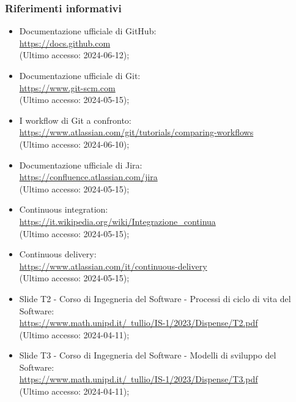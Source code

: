 \subsubsection{Riferimenti informativi}
\begin{itemize}
  \item Documentazione ufficiale di GitHub: \\ \href{https://docs.github.com}{https://docs.github.com}  \\ (Ultimo accesso: 2024-06-12);
  \item Documentazione ufficiale di Git: \\ \href{https://www.git-scm.com}{https://www.git-scm.com}  \\ (Ultimo accesso: 2024-05-15);
  \item I workflow di Git a confronto: \\ \href{https://www.atlassian.com/git/tutorials/comparing-workflows}{https://www.atlassian.com/git/tutorials/comparing-workflows}  \\ (Ultimo accesso: 2024-06-10);
  \item Documentazione ufficiale di Jira: \\ \href{https://confluence.atlassian.com/jira}{https://confluence.atlassian.com/jira}  \\ (Ultimo accesso: 2024-05-15);
  \item Continuous integration: \\ \href{https://it.wikipedia.org/wiki/Integrazionecontinua}{https://it.wikipedia.org/wiki/Integrazione\_continua}  \\ (Ultimo accesso: 2024-05-15);
  \item Continuous delivery: \\ \href{https://www.atlassian.com/it/continuous-delivery}{https://www.atlassian.com/it/continuous-delivery}  \\ (Ultimo accesso: 2024-05-15);
  \item Slide T2 - Corso di Ingegneria del Software - Processi di ciclo di vita del Software: \\ \href{https://www.math.unipd.it/~tullio/IS-1/2023/Dispense/T2.pdf}{https://www.math.unipd.it/~tullio/IS-1/2023/Dispense/T2.pdf}  \\ (Ultimo accesso: 2024-04-11);
  \item Slide T3 - Corso di Ingegneria del Software - Modelli di sviluppo del Software: \\ \href{https://www.math.unipd.it/~tullio/IS-1/2023/Dispense/T3.pdf}{https://www.math.unipd.it/~tullio/IS-1/2023/Dispense/T3.pdf}  \\ (Ultimo accesso: 2024-04-11);

\end{itemize}
